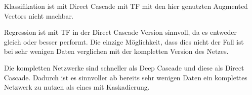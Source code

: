 Klassifikation ist mit Direct Cascade mit TF mit den hier genutzten Augmented Vectors nicht machbar. 

Regression ist mit TF in der Direct Cascade Version sinnvoll, da es entweder gleich oder besser performt. Die einzige Möglichkeit, dass dies 
nicht der Fall ist bei sehr wenigen Daten verglichen mit der kompletten Version des Netzes. 

Die kompletten Netzwerke sind schneller als Deep Cascade und diese als Direct Cascade. Dadurch ist es sinnvoller ab bereits sehr wenigen 
Daten ein komplettes Netzwerk zu nutzen als eines mit Kaskadierung. 
